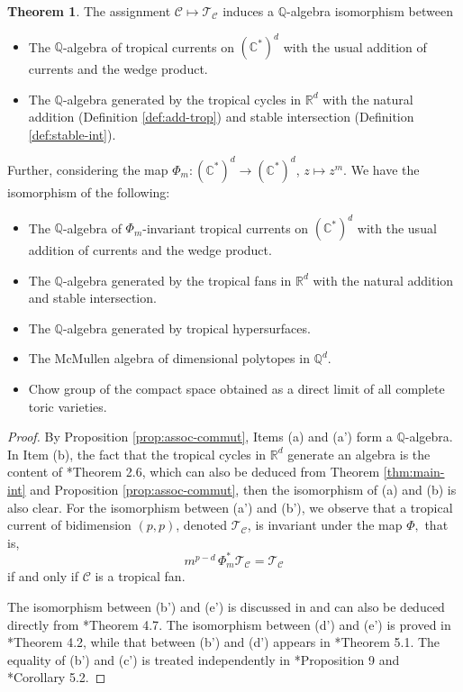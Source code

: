\documentclass[11pt]{amsart}
\theoremstyle{definition}
\newtheorem{theorem}{Theorem}[section]
\newcommand{\R}{\mathbb{R}}
\newcommand{\lto}{\longrightarrow}
\newcommand{\lmto}{\longmapsto}
\newcommand{\C}{\mathbb{C}}
\newcommand{\cC}{\mathcal{C}}
\newcommand{\sT}{\mathscr{T}}
\begin{document}
\begin{theorem}\label{thm:Q-alg}
   The assignment $ \cC \lmto \sT_{\cC} $ induces a $\mathbb{Q}$-algebra  isomorphism between
   \begin{itemize}
        \item [(a)] The $\mathbb{Q}$-algebra of tropical currents on $(\C^*)^d$ with the usual addition of currents and the wedge product.
        \item [(b)] The $\mathbb{Q}$-algebra generated by the tropical cycles in $\R^d$ with the natural addition  (Definition \ref{def:add-trop}) and stable intersection (Definition \ref{def:stable-int}).
       
   \end{itemize}
Further, considering the map $\Phi_m: (\C^*)^d \lto (\C^*)^d$,  $z\lmto z^m.$ We have the isomorphism of the following:
\begin{itemize}
\item [(a')] The $\mathbb{Q}$-algebra of $\Phi_m$-invariant tropical currents on $(\C^*)^d$ with the usual addition of currents and the wedge product.
\item [(b')] The $\mathbb{Q}$-algebra generated by the tropical fans in $\R^d$ with the natural addition  and stable intersection. 
     \item [(c')] The $\mathbb{Q}$-algebra generated by tropical hypersurfaces. 
      \item [(d')] The McMullen algebra of dimensional polytopes in $\mathbb{Q}^d$.
     \item [(e')] Chow group of the compact space obtained as a direct limit of all complete toric varieties. 
\end{itemize}
\end{theorem}
\begin{proof}
By Proposition \ref{prop:assoc-commut}, Items (a) and (a') form a $\mathbb{Q}$-algebra. In Item (b), the fact that the tropical cycles in $\R^d$ generate an algebra is the content of \cite{Jensen-Yu}*{Theorem 2.6}, which can also be deduced from Theorem \ref{thm:main-int} and Proposition \ref{prop:assoc-commut}, then the isomorphism of (a) and (b) is also clear. 
\vskip 2mm
For the isomorphism between (a') and (b'), we observe that a tropical current of bidimension $(p,p)$, denoted $\sT_{\cC}$, is invariant under the map $\Phi,$ that is,
\[
m^{p-d} \, \Phi_m^* \sT_{\cC} = \sT_{\cC}
\]
if and only if $\cC$ is a tropical fan.

The isomorphism between (b') and (e') is discussed in \cite{Fulton--Sturmfels} and can also be deduced directly from \cite{BH}*{Theorem 4.7}. The isomorphism between (d') and (e') is proved in \cite{Fulton--Sturmfels}*{Theorem 4.2}, while that between (b') and (d') appears in \cite{Jensen-Yu}*{Theorem 5.1}. The equality of (b') and (c') is treated independently in \cite{Kazarnovski}*{Proposition 9} and \cite{Jensen-Yu}*{Corollary 5.2}.
\end{proof}
\end{document}
